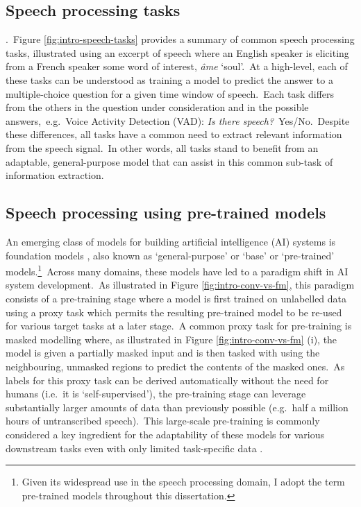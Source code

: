\documentclass[main.tex]{subfiles}
\begin{document}
\subsection{Speech processing tasks}

.~Figure \ref{fig:intro-speech-tasks} provides a summary of common speech processing tasks, illustrated using an excerpt of speech where an English speaker is eliciting from a French speaker some word of interest, \emph{âme} `soul'.~At a high-level, each of these tasks can be understood as training a model to predict the answer to a multiple-choice question for a given time window of speech.~Each task differs from the others in the question under consideration and in the possible answers,~e.g.~Voice Activity Detection (VAD): \emph{Is there speech?}~Yes/No.~Despite these differences, all tasks have a common need to extract relevant information from the speech signal.~In other words, all tasks stand to benefit from an adaptable, general-purpose model that can assist in this common sub-task of information extraction.

\subsection{Speech processing using pre-trained models}
\label{sec:chp2-FMs}

An emerging class of models for building artificial intelligence (AI) systems is foundation models \parencite[FMs:][]{bommasani2021opportunities}, also known as `general-purpose' or `base' or `pre-trained' models.\footnote{Given its widespread use in the speech processing domain, I adopt the term pre-trained models throughout this dissertation.}~Across many domains, these models have led to a paradigm shift in AI system development.~As illustrated in Figure \ref{fig:intro-conv-vs-fm}, this paradigm consists of a pre-training stage where a model is first trained on unlabelled data using a proxy task which permits the resulting pre-trained model to be re-used for various target tasks at a later stage.~A common proxy task for pre-training is masked modelling where, as illustrated in Figure \ref{fig:intro-conv-vs-fm} (i), the model is given a partially masked input and is then tasked with using the neighbouring, unmasked regions to predict the contents of the masked ones.~As labels for this proxy task can be derived automatically without the need for humans (i.e.~it is `self-supervised'), the pre-training stage can leverage substantially larger amounts of data than previously possible (e.g.~half a million hours of untranscribed speech).~This large-scale pre-training is commonly considered a key ingredient for the adaptability of these models for various downstream tasks even with only limited task-specific data \parencite[][]{bommasani2021opportunities}.
\end{document}

